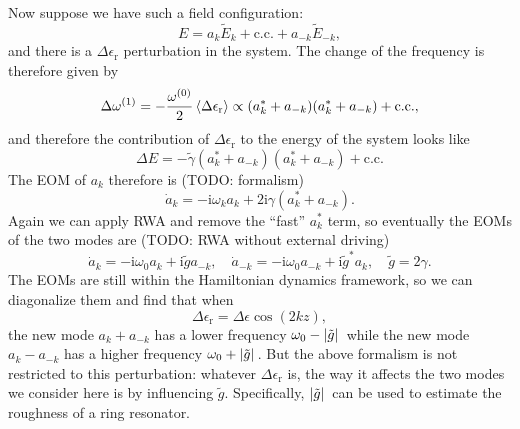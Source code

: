 \documentclass[hyperref, a4paper]{article}
\newcommand*{\ii}{\mathrm{i}}
\newcommand{\epsr}{\epsilon_{\text{r}}}
\begin{document}
Now suppose we have such a field configuration:
\begin{equation}
    E = a_k \tilde{E}_k + \text{c.c.} + a_{-k} \tilde{E}_{-k},
\end{equation}
and there is a $\Delta \epsr$ perturbation in the system.
The change of the frequency is therefore given by  
\begin{equation}
    \Delta \omega^{(1)} = - \frac{\omega^{(0)}}{2} \expval{\Delta \epsr}
    \propto (a_k^* + a_{-k}) (a_k^* + a_{-k}) + \text{c.c.},
\end{equation}
and therefore the contribution of $\Delta \epsr$ to the energy of the system looks like
\begin{equation}
    \Delta E = - \tilde{\gamma} (a_k^* + a_{-k}) (a_k^* + a_{-k}) + \text{c.c.} 
\end{equation}
The EOM of $a_k$ therefore is (TODO: formalism)
\begin{equation}
    \dot{a}_k = - \ii \omega_k a_k + 2 \ii \gamma (a_k^* + a_{-k}).
\end{equation}
Again we can apply RWA and remove the ``fast'' $a_k^*$ term, 
so eventually the EOMs of the two modes are (TODO: RWA without external driving)
\begin{equation}
    \dot{a}_k = - \ii \omega_0 a_k + \ii \tilde{g} a_{-k}, \quad 
    \dot{a}_{-k} = - \ii \omega_0 a_{-k} + \ii \tilde{g}^* a_{k}, \quad 
    \tilde{g} = 2 \gamma.
\end{equation}
The EOMs are still within the Hamiltonian dynamics framework, 
so we can diagonalize them and find that when 
\begin{equation}
    \Delta \epsr = \Delta \epsilon \cos(2kz),
\end{equation}
the new mode 
$a_{k} + a_{-k}$ has a lower frequency $\omega_0 - \abs*{\tilde{g}}$
while the new mode $a_{k} - a_{-k}$ has a higher frequency $\omega_0 + \abs*{\tilde{g}}$.
But the above formalism is not restricted to this perturbation: 
whatever $\Delta \epsr$ is, the way it affects the two modes we consider here 
is by influencing $\tilde{g}$.
Specifically, $\abs*{\tilde{g}}$ can be used to estimate the roughness of a ring resonator.
\end{document}

